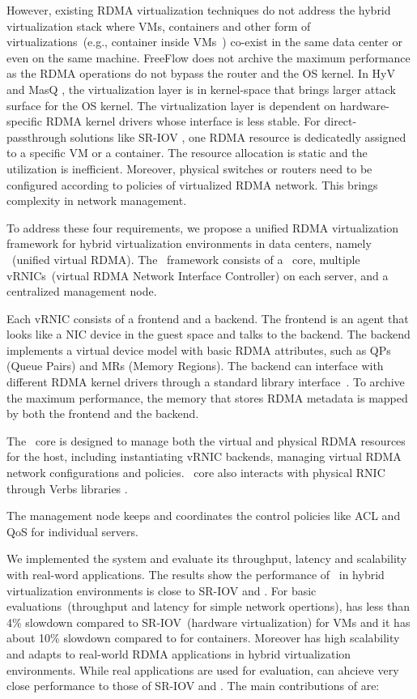 However, existing RDMA virtualization techniques do not address the hybrid virtualization stack where VMs, containers and other form of virtualizations~(e.g., container inside VMs~\cite{containeronvm}) co-exist in the same data center or even on the same machine.
FreeFlow \cite{kim2019freeflow} does not archive the maximum performance as the RDMA operations do not bypass the router and the OS kernel.
In HyV \cite{pfefferle2015hybrid} and MasQ \cite{he2020masq}, the virtualization layer is in kernel-space that brings larger attack surface for the OS kernel. The virtualization layer is dependent on hardware-specific RDMA kernel drivers whose interface is less stable. 
For direct-passthrough solutions like SR-IOV \cite{sr-iov}, one RDMA resource is dedicatedly assigned to a specific VM or a container. The resource allocation is static and the utilization is inefficient. Moreover, physical switches or routers need to be configured according to policies of virtualized RDMA network. This brings complexity in network management.

To address these four requirements, we propose a unified RDMA virtualization framework for hybrid virtualization environments in data centers, namely \sys~(unified virtual RDMA). The \sys~framework consists of a \sys~core, multiple vRNICs~(virtual RDMA Network Interface Controller) on each server, and a centralized management node.

Each vRNIC consists of a frontend and a backend. The frontend is an agent that looks like a NIC device in the guest space and talks to the backend. The backend implements a virtual device model with basic RDMA attributes, such as QPs (Queue Pairs) and MRs (Memory Regions). The backend can interface with different RDMA kernel drivers through a standard library interface~\cite{verbs}. To archive the maximum performance, the memory that stores RDMA metadata is mapped by both the frontend and the backend. 

The \sys~core is designed to manage both the virtual and physical RDMA resources for the host, including instantiating vRNIC backends, managing virtual RDMA network configurations and policies. \sys~core also interacts with physical RNIC through Verbs libraries \cite{verbs}.

The management node keeps and coordinates the control policies like ACL and QoS for individual servers.

We implemented the \sys system and evaluate its throughput, latency and scalability with real-word applications. The results show the performance of \sys~in hybrid virtualization environments is close to SR-IOV and \native. For basic evaluations~(throughput and latency for simple network opertions), \sys has less than 4\% slowdown compared to SR-IOV~(hardware virtualization) for VMs and it has about 10\% slowdown compared to \native for containers. Moreover \sys has high scalability and adapts to real-world RDMA applications in hybrid virtualization environments. While real applications are used for evaluation, \sys can ahcieve very close performance to those of SR-IOV and \native. The main contributions of \sys are:

